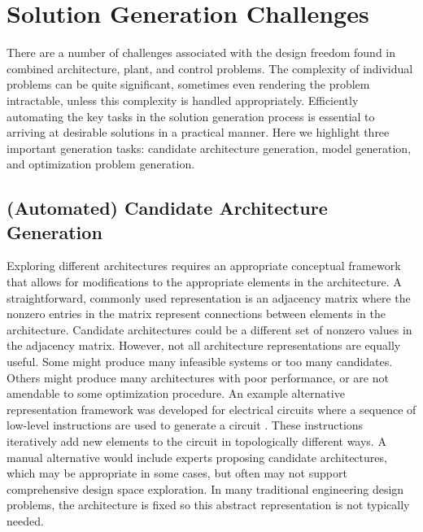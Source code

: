 \section{Solution Generation Challenges\label{sec:ch1:theorytools}}

There are a number of challenges associated with the design freedom found in combined architecture, plant, and control problems.
The complexity of individual problems can be quite significant, sometimes even rendering the problem intractable, unless this complexity is handled appropriately.  
Efficiently automating the key tasks in the solution generation process is essential to arriving at desirable solutions in a practical manner.
Here we highlight three important generation tasks: candidate architecture generation, model generation, and optimization problem generation.

\subsection{(Automated) Candidate Architecture Generation\label{sec:ch1:archgen}}

Exploring different architectures requires an appropriate conceptual framework that allows for modifications to the appropriate elements in the architecture.
A straightforward, commonly used representation is an adjacency matrix where the nonzero entries in the matrix represent connections between elements in the architecture.
Candidate architectures could be a different set of nonzero values in the adjacency matrix.
However, not all architecture representations are equally useful.
Some might produce many infeasible systems or too many candidates.
Others might produce many architectures with poor performance, or are not amendable to some optimization procedure.
An example alternative representation framework was developed for electrical circuits where a sequence of low-level instructions are used to generate a circuit \cite{Lohn1999a}.
These instructions iteratively add new elements to the circuit in  topologically different ways.
A manual alternative would include experts proposing candidate architectures, which may be appropriate in some cases, but often may not support comprehensive design space exploration.
In many traditional engineering design problems, the architecture is fixed so this abstract representation is not typically needed.

